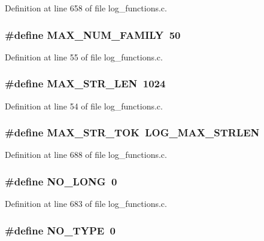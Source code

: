 Definition at line 658 of file log\_\-functions.c.
\subsubsection[{MAX\_\-NUM\_\-FAMILY}]{\setlength{\rightskip}{0pt plus 5cm}\#define MAX\_\-NUM\_\-FAMILY~50}\label{log__functions_8c_af4e296f9183ec79b458f5ed32c90bb1f}


Definition at line 55 of file log\_\-functions.c.
\subsubsection[{MAX\_\-STR\_\-LEN}]{\setlength{\rightskip}{0pt plus 5cm}\#define MAX\_\-STR\_\-LEN~1024}\label{log__functions_8c_a58ce36916c399104e18d32ff090f21c6}


Definition at line 54 of file log\_\-functions.c.
\subsubsection[{MAX\_\-STR\_\-TOK}]{\setlength{\rightskip}{0pt plus 5cm}\#define MAX\_\-STR\_\-TOK~LOG\_\-MAX\_\-STRLEN}\label{log__functions_8c_a23fb16e3c30fd5ff10a76caa951c9d7e}


Definition at line 688 of file log\_\-functions.c.
\subsubsection[{NO\_\-LONG}]{\setlength{\rightskip}{0pt plus 5cm}\#define NO\_\-LONG~0}\label{log__functions_8c_a9c919d7fc686060f58bc90179ac2c1df}


Definition at line 683 of file log\_\-functions.c.
\subsubsection[{NO\_\-TYPE}]{\setlength{\rightskip}{0pt plus 5cm}\#define NO\_\-TYPE~0}\label{log__functions_8c_a4159b53da9c6fe869517755161b5b3bc}


